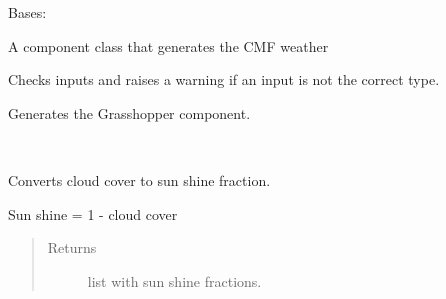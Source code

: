 \documentclass[letterpaper,10pt,english]{sphinxmanual}
\begin{document}
\begin{fulllineitems}
\label{\detokenize{cmf:livestock.components.comp_cmf.CMFWeather}}
Bases: {\hyperref[\detokenize{superclass:livestock.components.component.GHComponent}]{}}

A component class that generates the CMF weather

\begin{fulllineitems}
\label{\detokenize{cmf:livestock.components.comp_cmf.CMFWeather.check_inputs}}
Checks inputs and raises a warning if an input is not the correct type.

\end{fulllineitems}


\begin{fulllineitems}
\label{\detokenize{cmf:livestock.components.comp_cmf.CMFWeather.config}}
Generates the Grasshopper component.

\end{fulllineitems}


\begin{fulllineitems}
\label{\detokenize{cmf:livestock.components.comp_cmf.CMFWeather.convert_cloud_cover}}~
\begin{DUlineblock}{0em}
\item[] Converts cloud cover to sun shine fraction.
\item[] Sun shine = 1 - cloud cover
\end{DUlineblock}
\begin{quote}\begin{description}
\item[{Returns}] \leavevmode
list with sun shine fractions.

\end{description}\end{quote}

\end{fulllineitems}


\end{fulllineitems}
\end{document}
